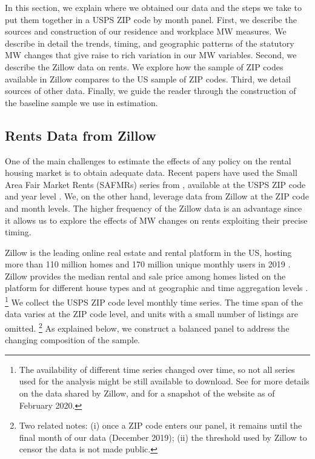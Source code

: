 
In this section, we explain where we obtained our data and the steps we take to 
put them together in a USPS ZIP code by month panel.
First, we describe the sources and construction of our residence and workplace 
MW measures.
We describe in detail the trends, timing, and geographic patterns of the 
statutory MW changes that give raise to rich variation in our MW variables.
Second, we describe the Zillow data on rents.
We explore how the sample of ZIP codes available in Zillow compares to the US 
sample of ZIP codes.
Third, we detail sources of other data.
Finally, we guide the reader through the construction of the baseline sample we
use in estimation.

\subsection{Rents Data from Zillow}

One of the main challenges to estimate the effects of any policy on the rental
housing market is to obtain adequate data.
Recent papers have used the Small Area Fair Market Rents (SAFMRs) series from 
\textcite{hudSAFMR}, available at the USPS ZIP code and year level 
\parencite{Tidemann2018, Yamagishi2019}.
We, on the other hand, leverage data from Zillow at the ZIP code and month 
levels.
The higher frequency of the Zillow data is an advantage since it allows us to 
explore the effects of MW changes on rents exploiting their precise timing.

Zillow is the leading online real estate and rental platform in the US, hosting
more than 110 million homes and 170 million unique monthly users in 2019 
\parencite{ZillowFacts}.
Zillow provides the median rental and sale price among homes listed on the 
platform for different house types and at geographic and time aggregation 
levels \parencite{ZillowData}.%
\footnote{The availability of different time series changed over time, so not 
all series used for the analysis might be still available to download.
See \textcite{ZillowData} for more details on the data shared by Zillow, and 
\textcite{ZillowDataArchive} for a snapshot of the website as of February 2020.} 
We collect the USPS ZIP code level monthly time series.
The time span of the data varies at the ZIP code level, and units with a small 
number of listings are omitted.%
\footnote{Two related notes:
(i) once a ZIP code enters our panel, it remains until the final month of our 
data (December 2019);
(ii) the threshold used by Zillow to censor the data is not made public.}
As explained below, we construct a balanced panel to address the changing 
composition of the sample.

